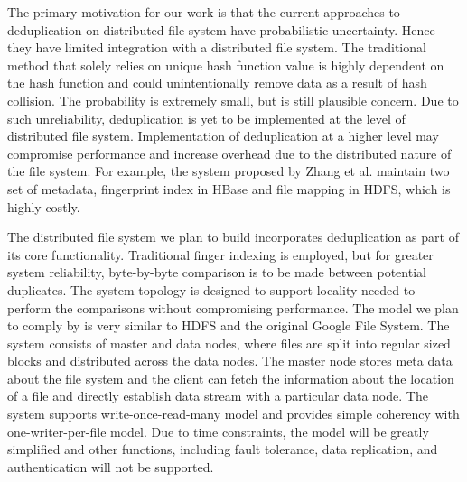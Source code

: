 \documentclass[11pt]{article}
\begin{document}
The primary motivation for our work is that the current approaches to deduplication on distributed file system have probabilistic uncertainty. Hence they have limited integration with a distributed file system. The traditional method that solely relies on unique hash function value is highly dependent on the hash function and could unintentionally remove data as a result of hash collision. The probability is extremely small, but is still plausible concern. Due to such unreliability, deduplication is yet to be implemented at the level of distributed file system. Implementation of deduplication at a higher level may compromise performance and increase overhead due to the distributed nature of the file system. For example, the system proposed by Zhang et al. maintain two set of metadata, fingerprint index in HBase and file mapping in HDFS, which is highly costly\cite{HDFSDe}.

The distributed file system we plan to build incorporates deduplication as part of its core functionality. Traditional finger indexing is employed, but for greater system reliability, byte-by-byte comparison is to be made between potential duplicates. The system topology is designed to support locality needed to perform the comparisons without compromising performance. The model we plan to comply by is very similar to HDFS and the original Google File System. The system consists of master and data nodes, where files are split into regular sized blocks and distributed across the data nodes. The master node stores meta data about the file system and the client can fetch the information about the location of a file and directly establish data stream with a particular data node. The system supports write-once-read-many model and provides simple coherency with one-writer-per-file model. Due to time constraints, the model will be greatly simplified and other functions, including fault tolerance, data replication, and authentication will not be supported.
\end{document}
